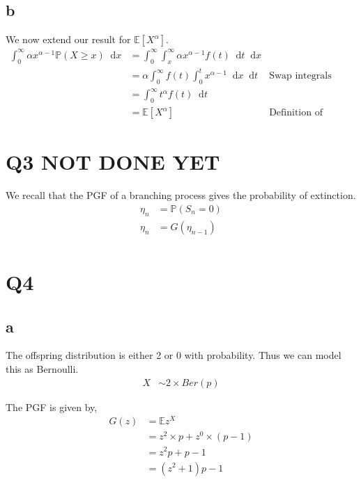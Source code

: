 \documentclass{article}
\newcommand{\diff}{\mathop{}\!\mathrm{d}}
\newcommand{\prob}{\mathbb{P}}
\newcommand{\expect}{\mathbb{E}}
\begin{document}
\subsection{b}
We now extend our result for $\expect\left[X^\alpha\right]$.
\begin{align*}
    \int_0^\infty \alpha x^{\alpha-1} \prob(X \geq x) \diff x
    &= \int_0^\infty \int_x^\infty \alpha x^{\alpha-1} f(t) \diff t \diff x \\
    &= \alpha \int_0^\infty f(t) \int_0^t x^{\alpha-1} \diff x \diff t
    & \text{Swap integrals} \\
    &= \int_0^\infty t^\alpha f(t) \diff t \\
    &= \expect \left[X^\alpha\right] & \text{Definition of expectation}
\end{align*}

\section{Q3 NOT DONE YET}
We recall that the PGF of a branching process gives the probability of
extinction.
\begin{align*}
    \eta_n &= \prob(S_n = 0) \\
    \eta_n &= G(\eta_{n-1}) \\
\end{align*}

\section{Q4}
\subsection{a}
The offspring distribution is either 2 or 0 with probability. Thus we can
model this as Bernoulli.
\begin{align*}
    X &\sim 2 \times Ber(p)
\end{align*}

The PGF is given by,
\begin{align*}
    G(z) &= \expect z^X \\
    &= z^2 \times p + z^0 \times (p-1) \\
    &= z^2 p + p - 1 \\
    &= \left(z^2 + 1\right) p - 1 \\
\end{align*}
\end{document}
